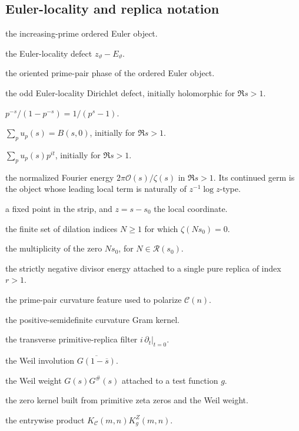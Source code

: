 \documentclass[11pt]{amsart}
\numberwithin{equation}{section}
\theoremstyle{plain}
\theoremstyle{definition}
\theoremstyle{remark}
\begin{document}
\subsection{Euler-locality and replica notation}
\label{subsec:notation_replica}

\begin{description}[leftmargin=3.2cm,style=nextline]
\item[\(E_\vartheta\)] the increasing-prime ordered Euler object.
\item[\(R_\vartheta\)] the Euler-locality defect \(z_\vartheta-E_\vartheta\).
\item[\(\Phi_{\rm ord}(n)\)] the oriented prime-pair phase of the ordered
Euler object.
\item[\(\mathcal O(s)\)] the odd Euler-locality Dirichlet defect, initially
holomorphic for \(\Re s>1\).
\item[\(u_p(s)\)] \(p^{-s}/(1-p^{-s})=1/(p^s-1)\).
\item[\(A(s)\)] \(\sum_pu_p(s)=B(s,0)\), initially for \(\Re s>1\).
\item[\(B(s,t)\)] \(\sum_pu_p(s)p^{it}\), initially for \(\Re s>1\).
\item[\(\mathcal I(s)\)] the normalized Fourier energy
\(2\pi\mathcal O(s)/\zeta(s)\) in \(\Re s>1\).  Its continued germ is the
object whose leading local term is naturally of
\(z^{-1}\log z\)-type.
\item[\(s_0\)] a fixed point in the strip, and \(z=s-s_0\) the local
coordinate.
\item[\(\mathcal R(s_0)\)] the finite set of dilation indices
\(N\ge1\) for which \(\zeta(Ns_0)=0\).
\item[\(q_N\)] the multiplicity of the zero \(Ns_0\), for
\(N\in\mathcal R(s_0)\).
\item[\(\beta_r\)] the strictly negative divisor energy attached to a
single pure replica of index \(r>1\).
\item[\(\Phi_{pq}(n)\)] the prime-pair curvature feature used to polarize \(\mathcal C(n)\).
\item[\(K_{\mathcal C}(m,n)\)] the positive-semidefinite curvature Gram kernel.
\item[\(\Pi\)] the transverse primitive-replica filter \(i\,\partial_t|_{t=0}\).
\item[\(G^\#(s)\)] the Weil involution \(\overline{G(1-\overline{s})}\).
\item[\(W_g(s)\)] the Weil weight \(G(s)G^\#(s)\) attached to a test function \(g\).
\item[\(K_g^Z(m,n)\)] the zero kernel built from primitive zeta zeros and the Weil weight.
\item[\(\mathscr K_g(m,n)\)] the entrywise product \(K_{\mathcal C}(m,n)K_g^Z(m,n)\).
\end{description}
\end{document}
